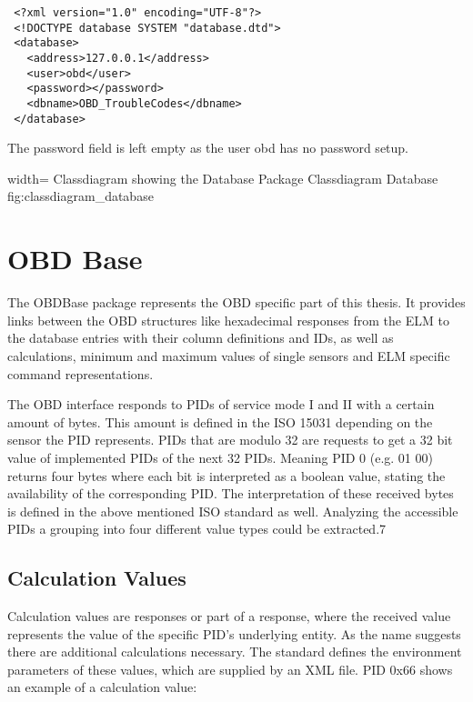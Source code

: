 \begin{verbatim}
 <?xml version="1.0" encoding="UTF-8"?>
 <!DOCTYPE database SYSTEM "database.dtd">
 <database>
   <address>127.0.0.1</address>
   <user>obd</user>
   <password></password>
   <dbname>OBD_TroubleCodes</dbname>
 </database>
\end{verbatim}

The password field is left empty as the user obd has no password setup.  

 {width=\textwidth}%
 {Classdiagram showing the Database Package}%
 {Classdiagram Database}%
 {fig:classdiagram_database}%


\section{OBD Base}
\label{sec:obdbase}
The OBDBase package represents the OBD specific part of this thesis. It provides links between the OBD structures like hexadecimal responses 
from the ELM to the database entries with their column definitions and IDs, as well as calculations, minimum and maximum values of single 
sensors and ELM specific command representations.

The OBD interface responds to PIDs of service mode I and II with a certain amount of bytes. This amount is defined in the ISO 15031 depending 
on the sensor the PID represents. PIDs that are modulo 32 are requests to get a 32 bit value of implemented PIDs of the next 32 PIDs. Meaning 
PID 0 (e.g. 01 00) returns four bytes where each bit is interpreted as a boolean value, stating the availability of the corresponding PID. The 
interpretation of these received bytes is defined in the above mentioned ISO standard as well. Analyzing the accessible PIDs a grouping into 
four different value types could be extracted.7

\subsection{Calculation Values}
Calculation values are responses or part of a response, where the received value represents the value of the specific PID’s underlying entity.
As the name suggests there are additional calculations necessary. The standard defines the environment parameters of these values, which are 
supplied by an XML file. PID 0x66 shows an example of a calculation value:

